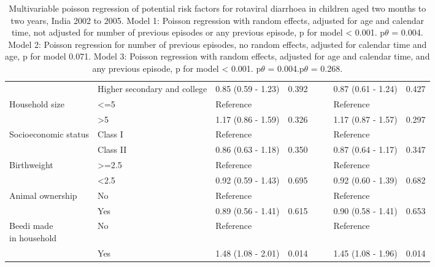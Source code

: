 \documentclass[11pt,a4paper]{article}\usepackage{graphicx, color}
\begin{document}
\begin{sidewaystable}[p]
\begin{center}
\begin{tabular}{llllllll}
 & Higher secondary and college & 0.85 (0.59 - 1.23) & \multicolumn{1}{r}{0.392} &  &  & 0.87 (0.61 - 1.24) & \multicolumn{1}{r}{0.427} \\ 
Household size & <=5 & Reference &  &  &  & Reference &  \\ 
 & >5 & 1.17 (0.86 - 1.59) & \multicolumn{1}{r}{0.326} &  &  & 1.17 (0.87 - 1.57) & \multicolumn{1}{r}{0.297} \\ 
Socioeconomic status & Class I  & Reference &  &  &  & Reference &  \\ 
 & Class II & 0.86 (0.63 - 1.18) & \multicolumn{1}{r}{0.350} &  &  & 0.87 (0.64 - 1.17) & \multicolumn{1}{r}{0.347} \\ 
Birthweight & >=2.5 & Reference &  &  &  & Reference &  \\ 
 & <2.5 & 0.92 (0.59 - 1.43) & \multicolumn{1}{r}{0.695} &  &  & 0.92 (0.60 - 1.39) & \multicolumn{1}{r}{0.682} \\ 
Animal ownership & No  & Reference &  &  &  & Reference &  \\ 
 & Yes & 0.89 (0.56 - 1.41) & \multicolumn{1}{r}{0.615} &  &  & 0.90 (0.58 - 1.41) & \multicolumn{1}{r}{0.653} \\ 
\shortstack{Beedi made \\ in household} & No & Reference &  &  &  & Reference &  \\ 
 & Yes & 1.48 (1.08 - 2.01) & \multicolumn{1}{r}{0.014} &  &  & 1.45 (1.08 - 1.96) & \multicolumn{1}{r}{0.014} \\ 
 \bottomrule
\end{tabular}
\end{center}
\caption{Multivariable poisson regression of potential risk factors for rotaviral diarrhoea in children aged two months to two years, India 2002 to 2005. 
Model 1: Poisson regression with random effects, adjusted for age and calendar time, not adjusted for number of previous episodes or any previous episode, p for model < 0.001. p$\theta$ = 0.004.
Model 2: Poisson regression for number of previous episodes, no random effects, adjusted for calendar time and age, p for model 0.071. 
Model 3: Poisson regression with random effects, adjusted for age and calendar time, and any previous episode, p for model < 0.001. p$\theta$ = 0.004.p$\theta$ = 0.268. }
\label{multivar}
\end{sidewaystable}
\end{document}
